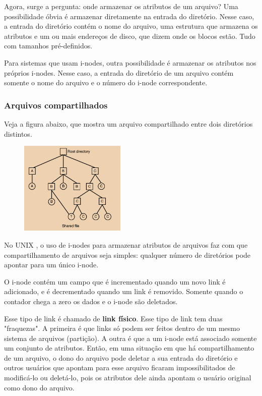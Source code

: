 \documentclass{article}
\newcommand\unix{{\color{red}UNIX} }
\begin{document}
Agora, surge a pergunta: onde armazenar os atributos de um arquivo? Uma possibilidade óbvia é armazenar diretamente na entrada do diretório. Nesse caso, a entrada do diretório contém o nome do arquivo, uma estrutura que armazena os atributos e um ou mais endereços de disco, que dizem onde os blocos estão. Tudo com tamanhos pré-definidos.

Para sistemas que usam i-nodes, outra possibilidade é armazenar os atributos nos próprios i-nodes. Nesse caso, a entrada do diretório de um arquivo contém somente o nome do arquivo e o número do i-node correspondente.

\subsubsection{Arquivos compartilhados}

Veja a figura abaixo, que mostra um arquivo compartilhado entre dois diretórios distintos.

\begin{figure}[h]
  \begin{center}
    \includegraphics[width=0.45\textwidth]{img/5-12.png}
  \end{center}
  \caption{}
  \label{fig:}
\end{figure}

No \unix, o uso de i-nodes para armazenar atributos de arquivos faz com que compartilhamento de arquivos seja simples: qualquer número de diretórios pode apontar para um único i-node.

O i-node contém um campo que é incrementado quando um novo link é adicionado, e é decrementado quando um link é removido. Somente quando o contador chega a zero os dados e o i-node são deletados.

Esse tipo de link é chamado de \textbf{link físico}. Esse tipo de link tem duas "fraquezas". A primeira é que links só podem ser feitos dentro de um mesmo sistema de arquivos (partição). A outra é que a um i-node está associado somente um conjunto de atributos. Então, em uma situação em que há compartilhamento de um arquivo, o dono do arquivo pode deletar a sua entrada do diretório e outros usuários que apontam para esse arquivo ficaram impossibilitados de modificá-lo ou deletá-lo, pois os atributos dele ainda apontam o usuário original como dono do arquivo.
\end{document}
